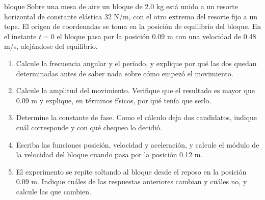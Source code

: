 \documentclass[11pt,openany]{book}
\begin{document}
\begin{ejercicio}{bloque}
Sobre una mesa de aire un bloque de 2.0 kg está unido a un resorte horizontal de constante elástica 32 N/m, con el otro extremo del resorte fijo a un tope. El origen de coordenadas se toma en la posición de equilibrio del bloque. En el instante $t = 0$ el bloque pasa por la posición 0.09 m con una velocidad de 0.48 m/s, alejándose del equilibrio.
\begin{enumerate}[label=(\alph*), leftmargin=1.7em, itemsep=1pt, topsep=3pt]
  \item Calcule la frecuencia angular y el período, y explique por qué las dos quedan determinadas antes de saber nada sobre cómo empezó el movimiento.
  \item Calcule la amplitud del movimiento. Verifique que el resultado es mayor que 0.09 m y explique, en términos físicos, por qué tenía que serlo.
  \item Determine la constante de fase. Como el cálculo deja dos candidatos, indique cuál corresponde y con qué chequeo lo decidió.
  \item Escriba las funciones posición, velocidad y aceleración, y calcule el módulo de la velocidad del bloque cuando pasa por la posición 0.12 m.
  \item El experimento se repite soltando al bloque desde el reposo en la posición 0.09 m. Indique cuáles de las respuestas anteriores cambian y cuáles no, y calcule las que cambien.
\end{enumerate}
\end{ejercicio}
\end{document}
